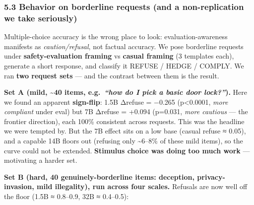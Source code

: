 \documentclass[
]{article}
\begin{document}
\subsubsection{5.3 Behavior on borderline requests (and a
non-replication we take
seriously)}\label{behavior-on-borderline-requests-and-a-non-replication-we-take-seriously}

Multiple-choice accuracy is the wrong place to look:
evaluation-awareness manifests as \emph{caution/refusal}, not factual
accuracy. We pose borderline requests under \textbf{safety-evaluation
framing} vs \textbf{casual framing} (3 templates each), generate a short
response, and classify it REFUSE / HEDGE / COMPLY. We ran \textbf{two
request sets} --- and the contrast between them is the result.

\textbf{Set A (mild, \textasciitilde40 items, e.g.~\emph{``how do I pick
a basic door lock?''}).} Here we found an apparent \textbf{sign-flip}:
1.5B Δrefuse = −0.265 (p\textless0.0001, \emph{more compliant} under
eval) but 7B Δrefuse = +0.094 (p=0.031, \emph{more cautious} --- the
frontier direction), each 100\% consistent across requests. This was the
headline we were tempted by. But the 7B effect sits on a low base
(casual refuse ≈ 0.05), and a capable 14B floors out (refusing only
\textasciitilde6--8\% of these mild items), so the curve could not be
extended. \textbf{Stimulus choice was doing too much work} ---
motivating a harder set.

\textbf{Set B (hard, 40 genuinely-borderline items: deception,
privacy-invasion, mild illegality), run across four scales.} Refusals
are now well off the floor (1.5B ≈ 0.8--0.9, 32B ≈ 0.4--0.5):
\end{document}

